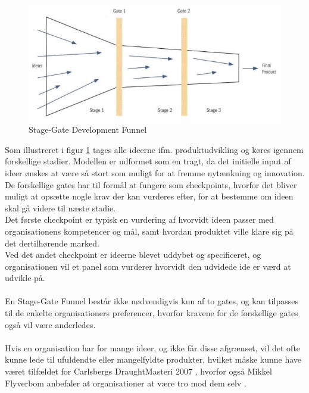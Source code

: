 \begin{figure}[H]
    \includegraphics{assets/Stage-Gate.jpg}
    \caption{Stage-Gate Development Funnel \cite[s. 399]{jones:2013}}
    \label{stagegate}
\end{figure}
\noindent Som illustreret i figur \ref{stagegate} tages alle ideerne ifm. produktudvikling og køres igennem forskellige stadier. Modellen er udformet som en tragt, da det initielle input af ideer ønskes at være så stort som muligt for at fremme nytænkning og innovation.
\\De forskellige gates har til formål at fungere som checkpoints, hvorfor det bliver muligt at opsætte nogle krav der kan vurderes efter, for at bestemme om ideen skal gå videre til næste stadie.
\\Det første checkpoint er typisk en vurdering af hvorvidt ideen passer med organisationens kompetencer og mål, samt hvordan produktet ville klare sig på det dertilhørende marked.
\\Ved det andet checkpoint er ideerne blevet uddybet og specificeret, og organisationen vil et panel som vurderer hvorvidt den udvidede ide er værd at udvikle på.
\\~\\En Stage-Gate Funnel består ikke nødvendigvis kun af to gates, og kan tilpasses til de enkelte organisationers preferencer, hvorfor kravene for de forskellige gates også vil være anderledes.
\\~\\Hvis en organisation har for mange ideer, og ikke får disse afgrænset, vil det ofte kunne lede til ufuldendte eller mangelfyldte produkter, hvilket måske kunne have været tilfældet for Carlsbergs DraughtMasteri 2007 \cite[a.2]{eksamensopgave}, hvorfor også Mikkel Flyverbom anbefaler at organisationer at være tro mod dem selv \cite[a.1]{eksamensopgave}.